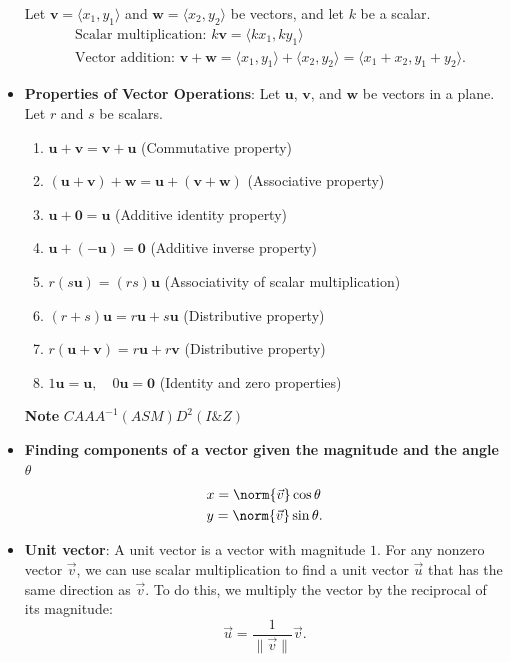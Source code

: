 \documentclass{report}
\begin{document}
\begin{itemize}
        Let $\mathbf{v} = \langle x_1, y_1 \rangle$ and $\mathbf{w} = \langle x_2, y_2 \rangle$ be vectors, and let $k$ be a scalar.
        \begin{align*}
            &\text{Scalar multiplication: } k\mathbf{v} = \langle kx_1, ky_1 \rangle \\
            &\text{Vector addition: } \mathbf{v} + \mathbf{w} = \langle x_1, y_1 \rangle + \langle x_2, y_2 \rangle = \langle x_1 + x_2, y_1 + y_2 \rangle
        .\end{align*}
    \item \textbf{Properties of Vector Operations}:
        Let $\mathbf{u}$, $\mathbf{v}$, and $\mathbf{w}$ be vectors in a plane. Let $r$ and $s$ be scalars.
        \begin{enumerate}
            \item $\mathbf{u} + \mathbf{v} = \mathbf{v} + \mathbf{u}$ \quad (Commutative property)
            \item $(\mathbf{u} + \mathbf{v}) + \mathbf{w} = \mathbf{u} + (\mathbf{v} + \mathbf{w})$ \quad (Associative property)
            \item $\mathbf{u} + \mathbf{0} = \mathbf{u}$ \quad (Additive identity property)
            \item $\mathbf{u} + (-\mathbf{u}) = \mathbf{0}$ \quad (Additive inverse property)
            \item $r(s\mathbf{u}) = (rs)\mathbf{u}$ \quad (Associativity of scalar multiplication)
            \item $(r + s)\mathbf{u} = r\mathbf{u} + s\mathbf{u}$ \quad (Distributive property)
            \item $r(\mathbf{u} + \mathbf{v}) = r\mathbf{u} + r\mathbf{v}$ \quad (Distributive property)
            \item $1\mathbf{u} = \mathbf{u}, \quad 0\mathbf{u} = \mathbf{0}$ \quad (Identity and zero properties)
        \end{enumerate}
        \textbf{Note} $CAAA^{-1}(ASM)D^{2}(I\&Z)$
    \item \textbf{Finding components of a vector given the magnitude and the angle $\theta$}
        \begin{align*}
            &x = \norm{\vec{v}}\cos{\theta } \\
            &y = \norm{\vec{v}}\sin{\theta }
        .\end{align*}
    \item \textbf{Unit vector}: A unit vector is a vector with magnitude $1$. For any nonzero vector $\vec{v}$, we can use scalar multiplication to find a unit vector $\vec{u}$ that has the same direction as $\vec{v}$. To do this, we multiply the vector by the reciprocal of its magnitude:
        \[
            \vec{u} = \frac{1}{\lVert \vec{v} \rVert} \vec{v}.
        \]


\end{itemize}
\end{document}
